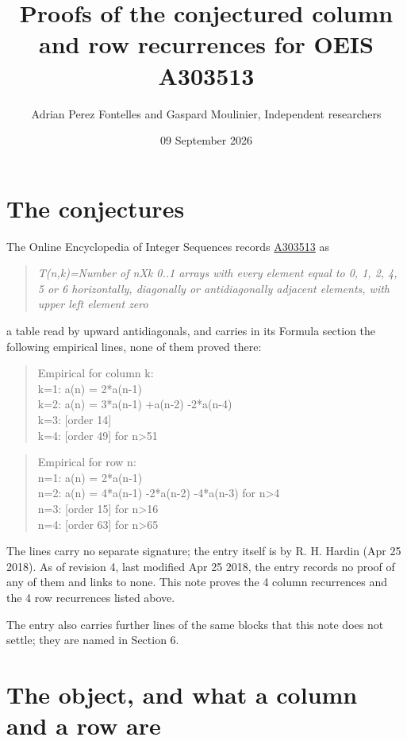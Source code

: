 \documentclass[11pt]{article}
\title{Proofs of the conjectured column and row recurrences for OEIS A303513}
\author{Adrian Perez Fontelles and Gaspard Moulinier, Independent researchers}
\date{09 September 2026}
\theoremstyle{definition}
\begin{document}
\maketitle
\section{The conjectures}

The Online Encyclopedia of Integer Sequences records \href{https://oeis.org/A303513}{A303513} as

\begin{quote}\itshape T(n,k)=Number of nXk 0..1 arrays with every element equal to 0, 1, 2, 4, 5 or 6 horizontally, diagonally or antidiagonally adjacent elements, with upper left element zero\end{quote}

a table read by upward antidiagonals, and carries in its Formula section the following empirical lines, none of them proved there:

\begin{quote}\ttfamily Empirical for column k:\\
k=1: a(n) = 2*a(n-1)\\k=2: a(n) = 3*a(n-1) +a(n-2) -2*a(n-4)\\k=3: [order 14]\\k=4: [order 49] for n>51\end{quote}

\begin{quote}\ttfamily Empirical for row n:\\
n=1: a(n) = 2*a(n-1)\\n=2: a(n) = 4*a(n-1) -2*a(n-2) -4*a(n-3) for n>4\\n=3: [order 15] for n>16\\n=4: [order 63] for n>65\end{quote}

The lines carry no separate signature; the entry itself is by R. H. Hardin (Apr 25 2018). As of revision 4, last modified Apr 25 2018, the entry records no proof of any of them and links to none. This note proves the 4 column recurrences and the 4 row recurrences listed above.

The entry also carries further lines of the same blocks that this note does not settle; they are named in Section 6.

\section{The object, and what a column and a row are}
\end{document}
